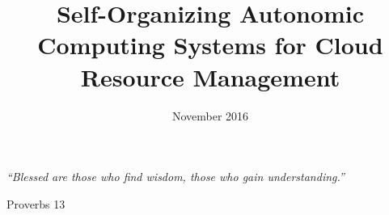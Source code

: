 \documentclass[a4paper, 12pt, oneside]{Thesis}  %
\numberwithin{algorithm}{chapter}
\begin{document}

\setlength{\headheight}{27.5pt}\textsl{}
\frontmatter	  %

\title  {Self-Organizing Autonomic Computing Systems for Cloud Resource Management}
\addresses  {\groupname\\\deptname\\\univname}  %
\date       {November 2016}

\maketitle


\fancyhead{}  %
\rhead{\thepage}  %
\lhead{}  %

\pagestyle{fancy}  %

\pagestyle{empty}  %

\null\vfill
\textit{``Blessed are those who find wisdom, those who gain understanding.''}

\begin{flushright}
Proverbs 13
\end{flushright}

\vfill\vfill\vfill\vfill\vfill\vfill\null
\clearpage  %
\end{document}
